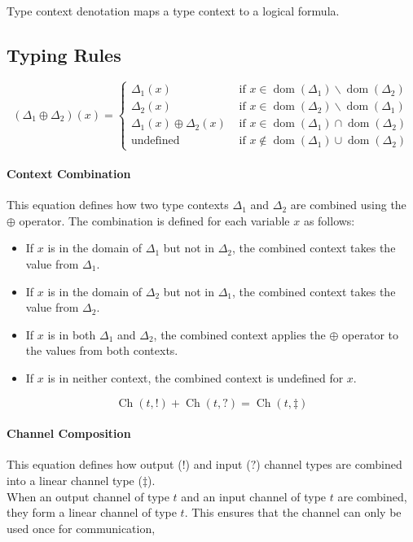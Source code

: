 \documentclass[master,english]{kuisthesis}
\theoremstyle{definition}
\begin{document}
Type context denotation maps a type context to a logical formula.
\newcommand{\R}[1]{\Code{R}({#1})}


\subsection{Typing Rules}


$$
\left(\Delta_1 \oplus \Delta_2\right)(x)= \begin{cases}\Delta_1(x) & \text { if } x \in \operatorname{dom}\left(\Delta_1\right)\backslash \operatorname{dom}\left(\Delta_2\right) \\ \Delta_2(x) & \text { if } x \in \operatorname{dom}\left(\Delta_2\right) \backslash \operatorname{dom}\left(\Delta_1\right) \\ \Delta_1(x) \oplus \Delta_2(x) & \text { if } x\in \operatorname{dom}\left(\Delta_1\right) \cap \operatorname{dom}\left(\Delta_2\right) \\ \text {undefined } & \text { if } x \notin \operatorname{dom}\left(\Delta_1\right) \cup \operatorname{dom}\left(\Delta_2\right)\end{cases}
$$
\paragraph{Context Combination}
This equation defines how two type contexts \(\Delta_1\) and \(\Delta_2\) are combined using the \(\oplus\) operator. The combination is defined for each variable \(x\) as follows:
\begin{itemize}
\item  If \(x\) is in the domain of \(\Delta_1\) but not in \(\Delta_2\), the combined context takes the value from \(\Delta_1\).
\item  If \(x\) is in the domain of \(\Delta_2\) but not in \(\Delta_1\), the combined context takes the value from \(\Delta_2\).
\item  If \(x\) is in both \(\Delta_1\) and \(\Delta_2\), the combined context applies the \(\oplus\) operator to the values from both contexts.
\item If \(x\) is in neither context, the combined context is undefined for \(x\).
\end{itemize}

$$
\operatorname{Ch}\left(t, !\right)+\operatorname{Ch}(t, ?)=\operatorname{Ch}\left(t, \ddagger\right)
$$
\paragraph{Channel Composition}
This equation defines how output (\(!\)) and input (\(?\)) channel types are combined into a linear channel type (\(\ddagger\)). \\
When an output channel of type \(t\) and an input channel of type \(t\) are combined, they form a linear channel of type \(t\). This ensures that the channel can only be used once for communication, 
\end{document}
